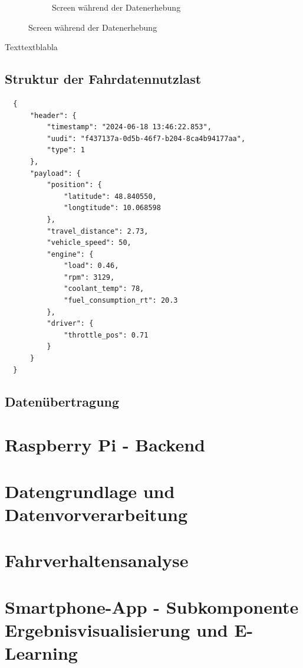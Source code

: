 \documentclass[oneside]{ausarbeitung}
\begin{document}
\begin{figure}[h!]
\begin{subfigure}{0.45\textwidth}
    \caption{Screen während der Datenerhebung}
    \label{fig:app_rec}
  \end{subfigure}
\end{figure}

Texttextblabla

\subsection*{Struktur der Fahrdatennutzlast}

\begin{verbatim}
  {
      "header": {
          "timestamp": "2024-06-18 13:46:22.853",
          "uudi": "f437137a-0d5b-46f7-b204-8ca4b94177aa",
          "type": 1
      },
      "payload": {
          "position": {
              "latitude": 48.840550,
              "longtitude": 10.068598
          },
          "travel_distance": 2.73,
          "vehicle_speed": 50,
          "engine": {
              "load": 0.46,
              "rpm": 3129,
              "coolant_temp": 78,
              "fuel_consumption_rt": 20.3
          },
          "driver": {
              "throttle_pos": 0.71
          }
      }
  }
  \end{verbatim}

\subsection*{Datenübertragung}

\section{Raspberry Pi - Backend}
\label{sec:implement_backend}

\section{Datengrundlage und Datenvorverarbeitung}
\label{sec:implement_dataprocessing}

\section{Fahrverhaltensanalyse}
\label{sec:implement_Fahrverhaltensanalyse}

\section{Smartphone-App - Subkomponente Ergebnisvisualisierung und E-Learning}
\label{sec:implement_elearning}
\end{document}
